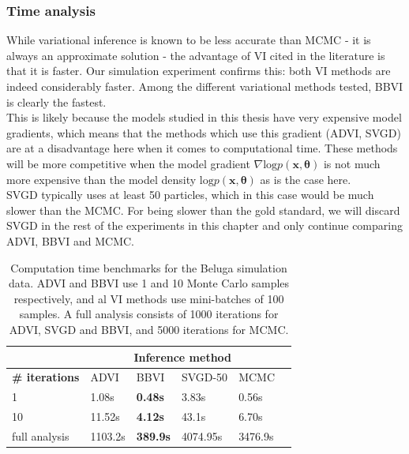 \subsubsection{Time analysis}
While variational inference is known to be less accurate than MCMC - it is always an approximate solution - the advantage of VI cited in the literature \parencite{vi-review} is that it is faster. Our simulation experiment confirms this: both VI methods are indeed considerably faster. Among the different variational methods tested, BBVI is clearly the fastest. 
\\
This is likely because the models studied in this thesis have very expensive model gradients, which means that the methods which use this gradient (ADVI, SVGD) are at a disadvantage here when it comes to computational time. These methods will be more competitive when the model gradient $\nabla\mathrm{log}p(\bm x, \bm\theta)$ is not much more expensive than the model density $\mathrm{log}p(\bm x, \bm\theta)$ as is the case here.
\\
SVGD typically uses at least 50 particles, which in this case would be much slower than the MCMC. For being slower than the gold standard, we will discard SVGD in the rest of the experiments in this chapter and only continue comparing ADVI, BBVI and MCMC.



\begin{table}[]

    \caption[Beluga computation time benchmarks]{Computation time benchmarks for the Beluga simulation data. ADVI and BBVI use 1 and 10 Monte Carlo samples respectively, and al VI methods use mini-batches of 100 samples. A full analysis consists of 1000 iterations for ADVI, SVGD and BBVI, and 5000 iterations for MCMC.}
    \centering
    \begin{tabular}{l||lllll|}
    \cline{2-5}
     & \multicolumn{4}{c|}{\textbf{Inference method}}                                                                            \\ \hline
    \multicolumn{1}{|l||}{\textbf{\# iterations}} & \multicolumn{1}{l|}{ADVI} & \multicolumn{1}{l|}{BBVI}  & \multicolumn{1}{l|}{SVGD-50} & MCMC \\ \hline
    \multicolumn{1}{|l||}{1}                      &         1.08s             &          \textbf{0.48s}               &            3.83s                 &                                 0.56s   \\ \hline
    \multicolumn{1}{|l||}{10}                     &         11.52s            &           \textbf{4.12s}                &          43.1s           &                       6.70s \\ \hline
    \multicolumn{1}{|l||}{full analysis}          &         1103.2s                  &     \textbf{389.9s}         &     4074.95s                &                                 3476.9s   \\ \hline
    \end{tabular}
    \label{tab:time-sim}

\end{table}



